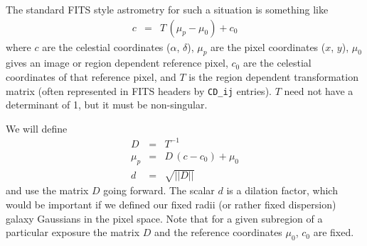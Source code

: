 \documentclass[modern]{aastex6}
\renewcommand{\det}[1]{||{#1}||}
\begin{document}
The standard FITS style astrometry for such a situation \citep{greisen02} is something like
\begin{eqnarray}
c & = & T \, (\mu_p - \mu_0) + c_0
\end{eqnarray}
where $c$ are the celestial coordinates ($\alpha$, $\delta$),
$\mu_p$ are the pixel coordinates ($x$, $y$),
$\mu_0$ gives an image or region dependent reference pixel,
$c_0$ are the celestial coordinates of that reference pixel,
and $T$ is the region dependent transformation matrix (often represented in FITS headers by \texttt{CD\_ij} entries).
$T$ need not have a determinant of 1, but it must be non-singular. 

We will define
\begin{eqnarray}
D & = & T^{-1} \\
\mu_p & = & D \, (c - c_0) + \mu_0 \nonumber \\
d & = &\sqrt{\det{D}} \nonumber
\end{eqnarray}
and use the matrix $D$ going forward.
The scalar $d$ is a dilation factor, which would be important if we defined our fixed radii (or rather fixed dispersion) galaxy Gaussians  in the pixel space.
Note that for a given subregion of a particular exposure the matrix $D$ and the reference coordinates $\mu_0$, $c_0$ are fixed.
\end{document}
